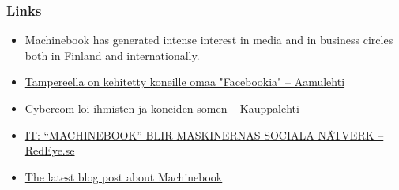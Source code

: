 \documentclass[8pt]{beamer}
\begin{document}
\begin{frame}
\frametitle{Links}
\begin{itemize}
 \item Machinebook has generated intense interest in media and in business circles both in Finland and internationally.
 \item \textcolor{blue}{\href{http://www.aamulehti.fi/kotimaa/hervannassa-on-kehitetty-koneille-omaa-facebookia/}{Tampereella on kehitetty koneille omaa "Facebookia" – Aamulehti}}
 \item \textcolor{blue}{\href{http://www.kauppalehti.fi/uutiset/cybercom-loi-ihmisten-ja-koneiden-somen/nrWndBBV}{Cybercom loi ihmisten ja koneiden somen – Kauppalehti}}
 \item \textcolor{blue}{\href{http://www.redeye.se/aktieguiden/nyheter/it-machinebook-blir-maskinernas-sociala-natverk}{IT: ``MACHINEBOOK'' BLIR MASKINERNAS SOCIALA NÄTVERK – RedEye.se}}
 \item \textcolor{blue}{\href{http://www.cybercom.com/About-Cybercom/Blogs/the-connected-world/machinebook/}{The latest blog post about Machinebook}}
\end{itemize}
\end{frame}
\end{document}

